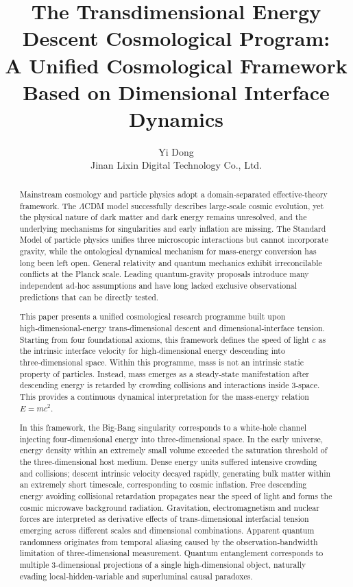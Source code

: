 \documentclass[12pt,a4paper]{article}
\title{The Transdimensional Energy Descent Cosmological Program:\\
A Unified Cosmological Framework Based on Dimensional Interface Dynamics}
\author{Yi Dong \\
Jinan Lixin Digital Technology Co., Ltd.}
\date{}
\begin{document}
\maketitle

\begin{abstract}
Mainstream cosmology and particle physics adopt a domain‑separated effective‑theory framework. The $\Lambda$CDM model successfully describes large‑scale cosmic evolution, yet the physical nature of dark matter and dark energy remains unresolved, and the underlying mechanisms for singularities and early inflation are missing. The Standard Model of particle physics unifies three microscopic interactions but cannot incorporate gravity, while the ontological dynamical mechanism for mass‑energy conversion has long been left open. General relativity and quantum mechanics exhibit irreconcilable conflicts at the Planck scale. Leading quantum‑gravity proposals introduce many independent ad‑hoc assumptions and have long lacked exclusive observational predictions that can be directly tested.

This paper presents a unified cosmological research programme built upon high‑dimensional‑energy trans‑dimensional descent and dimensional‑interface tension. Starting from four foundational axioms, this framework defines the speed of light $c$ as the intrinsic interface velocity for high‑dimensional energy descending into three‑dimensional space. Within this programme, mass is not an intrinsic static property of particles. Instead, mass emerges as a steady‑state manifestation after descending energy is retarded by crowding collisions and interactions inside 3‑space. This provides a continuous dynamical interpretation for the mass‑energy relation $E=mc^2$.

In this framework, the Big‑Bang singularity corresponds to a white‑hole channel injecting four‑dimensional energy into three‑dimensional space. In the early universe, energy density within an extremely small volume exceeded the saturation threshold of the three‑dimensional host medium. Dense energy units suffered intensive crowding and collisions; descent intrinsic velocity decayed rapidly, generating bulk matter within an extremely short timescale, corresponding to cosmic inflation. Free descending energy avoiding collisional retardation propagates near the speed of light and forms the cosmic microwave background radiation. Gravitation, electromagnetism and nuclear forces are interpreted as derivative effects of trans‑dimensional interfacial tension emerging across different scales and dimensional combinations. Apparent quantum randomness originates from temporal aliasing caused by the observation‑bandwidth limitation of three‑dimensional measurement. Quantum entanglement corresponds to multiple 3‑dimensional projections of a single high‑dimensional object, naturally evading local‑hidden‑variable and superluminal causal paradoxes.


\end{abstract}
\end{document}
